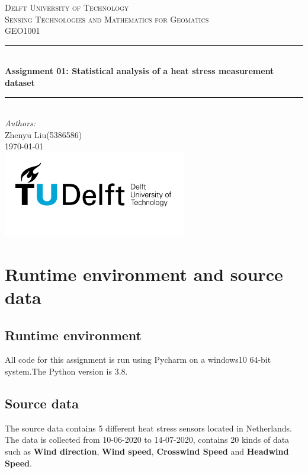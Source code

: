 \documentclass[a4paper]{article}
\begin{document}
\begin{titlepage}

\newcommand{\HRule}{\rule{\linewidth}{0.5mm}} 							%
\center 
 
\textsc{\LARGE Delft University of Technology}\\[1cm]

\textsc{\Large Sensing Technologies and Mathematics for Geomatics}\\[0.2cm]
\textsc{\large GEO1001}\\[1cm] 										%
\HRule \\[0.8cm]
{ \huge \bfseries Assignment 01: Statistical analysis of a heat stress measurement dataset}\\[0.7cm]								%
\HRule \\[2cm]
\large
\emph{Authors:}\\
Zhenyu Liu(5386586)\\[1.5cm]													%
{\large \today}\\[5cm]
\includegraphics[width=0.6\textwidth]{images/TU_delft_logo.jpg}\\[1cm] 	%
\vfill 
\end{titlepage}


\section{Runtime environment and source data}
\subsection{Runtime environment}
\noindent All code for this assignment is run using Pycharm on a windows10 64-bit system.The Python version is 3.8.

\subsection{Source data}
\noindent The source data contains 5 different heat stress sensors located in Netherlands. The data is collected from 10-06-2020 to 14-07-2020, contains 20 kinds of data such as \textbf{Wind direction}, \textbf{Wind speed}, \textbf{Crosswind Speed} and \textbf{Headwind Speed}.\cite{Maiullari2020}
\end{document}
